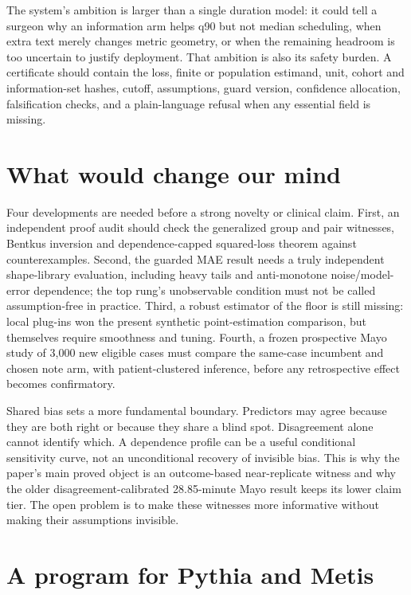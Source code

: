 \documentclass[11pt,a4paper]{article}
\begin{document}
The system's ambition is larger than a single duration model: it could tell a surgeon why an information arm helps q90 but not median scheduling, when extra text merely changes metric geometry, or when the remaining headroom is too uncertain to justify deployment. That ambition is also its safety burden. A certificate should contain the loss, finite or population estimand, unit, cohort and information-set hashes, cutoff, assumptions, guard version, confidence allocation, falsification checks, and a plain-language refusal when any essential field is missing.

\section{What would change our mind}

Four developments are needed before a strong novelty or clinical claim. First, an independent proof audit should check the generalized group and pair witnesses, Bentkus inversion and dependence-capped squared-loss theorem against counterexamples. Second, the guarded MAE result needs a truly independent shape-library evaluation, including heavy tails and anti-monotone noise/model-error dependence; the top rung's unobservable condition must not be called assumption-free in practice. Third, a robust estimator of the floor is still missing: local plug-ins won the present synthetic point-estimation comparison, but themselves require smoothness and tuning. Fourth, a frozen prospective Mayo study of 3,000 new eligible cases must compare the same-case incumbent and chosen note arm, with patient-clustered inference, before any retrospective effect becomes confirmatory.

Shared bias sets a more fundamental boundary. Predictors may agree because they are both right or because they share a blind spot. Disagreement alone cannot identify which. A dependence profile can be a useful conditional sensitivity curve, not an unconditional recovery of invisible bias. This is why the paper's main proved object is an outcome-based near-replicate witness and why the older disagreement-calibrated 28.85-minute Mayo result keeps its lower claim tier. The open problem is to make these witnesses more informative without making their assumptions invisible.

\section{A program for Pythia and Metis}
\end{document}
